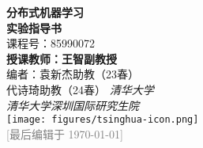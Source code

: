 \thispagestyle{empty}
\begin{titlepage}
    \begin{center}
        \vspace*{0pt}
        \makeatletter    
        \Large{\textbf{分布式机器学习}\\}
        \vspace{1ex}
        \Huge{\textbf{实验指导书}\\}
        \vspace{1ex}
        \small{课程号：85990072\\}
        \large
        \vspace{5ex}
        \textbf{授课教师：王智副教授}\\
        \vspace{.5ex}
        编者：袁新杰助教（23春）\\
        \hspace{3em}代诗琦助教（24春）
        \vfill
        \large\textit{清华大学}\\
        \large\textit{清华大学深圳国际研究生院}\\
        \vspace{3ex}
        \texttt{[image: figures/tsinghua-icon.png]}\\
        \vspace{2ex}
        \large
        \vspace{.5ex}
        \footnotesize \textcolor{gray}{[最后编辑于 \today]}
        \makeatother
    \end{center}
\end{titlepage}